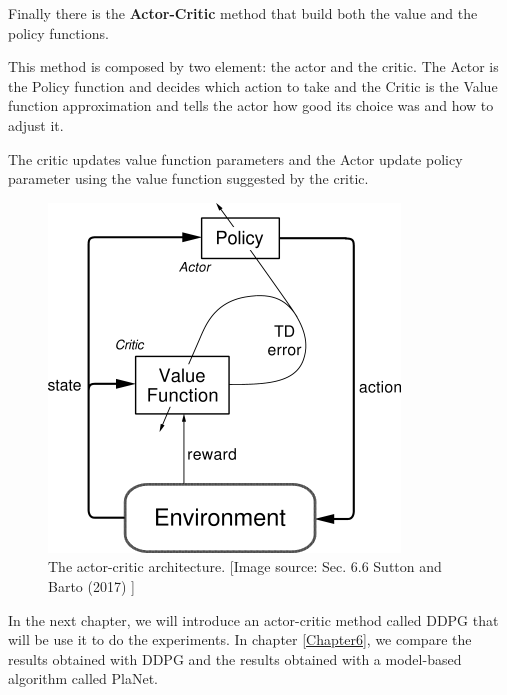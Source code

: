 Finally there is the \textbf{Actor-Critic} method that build both the value and the policy functions.

This method is composed by two element: the actor and the critic.
The Actor is the Policy function and decides which action to take and the Critic is the Value function approximation and tells the actor how good its choice was and how to adjust it.



The critic updates value function parameters and the Actor update policy parameter using the value function suggested by the critic. 

\begin{figure}[h]
\centering
\includegraphics[width=.9 \textwidth, height=.6\textheight]{pictures/ac_schema}
\caption{ The actor-critic architecture. [Image source: Sec. 6.6 Sutton and Barto (2017)  \cite{bib:2018Sutton_RLBook}]}
\end{figure}
In the next chapter, we will introduce an actor-critic method called DDPG that will be use it to do the experiments. In chapter \ref{Chapter6}, we compare the results obtained with DDPG and the results obtained with a model-based algorithm called PlaNet.  
